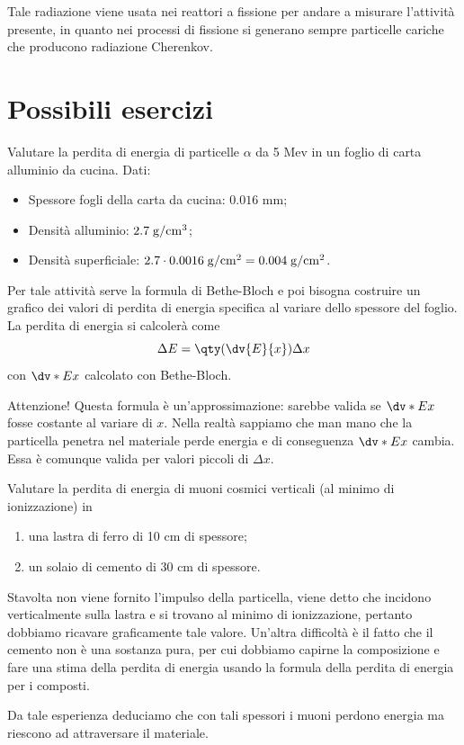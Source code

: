 Tale radiazione viene usata nei reattori a fissione per andare a misurare l'attività presente, in quanto nei processi di fissione si generano sempre particelle cariche che producono radiazione Cherenkov.

\section{Possibili esercizi}

\begin{esercizio}
    Valutare la perdita di energia di particelle $\alpha$ da 5 Mev in un foglio di carta alluminio da cucina. Dati:

    \begin{itemize}
        \item Spessore fogli della carta da cucina: $0.016$ mm;
        \item Densità alluminio: $2.7 \; \rm g/cm^3$;
        \item Densità superficiale: $2.7 \cdot 0.0016 \rm \; g/cm^2=0.004 \; g/cm^2$.
    \end{itemize}
    
    Per tale attività serve la formula di Bethe-Bloch e poi bisogna costruire un grafico dei valori di perdita di energia specifica al variare dello spessore del foglio. La perdita di energia si calcolerà come
    \begin{equation*}
        \Delta E=\qty(\dv{E}{x}) \Delta x
    \end{equation*}
    con $\dv*{E}{x}$ calcolato con Bethe-Bloch.

    Attenzione! Questa formula è un'approssimazione: sarebbe valida se $\dv*{E}{x}$ fosse costante al variare di $x$. Nella realtà sappiamo che man mano che la particella penetra nel materiale perde energia e di conseguenza $\dv*{E}{x}$ cambia. Essa è comunque valida per valori piccoli di $\Delta x$.
\end{esercizio}

\begin{esercizio}
    Valutare la perdita di energia di muoni cosmici verticali (al minimo di ionizzazione) in
    \begin{enumerate}[label=\alph*.]
        \item una lastra di ferro di 10 cm di spessore;
        \item un solaio di cemento di 30 cm di spessore.
    \end{enumerate}
    Stavolta non viene fornito l'impulso della particella, viene detto che incidono verticalmente sulla lastra e si trovano al minimo di ionizzazione, pertanto dobbiamo ricavare graficamente tale valore. Un'altra difficoltà è il fatto che il cemento non è una sostanza pura, per cui dobbiamo capirne la composizione e fare una stima della perdita di energia usando la formula della perdita di energia per i composti.
    
    Da tale esperienza deduciamo che con tali spessori i muoni perdono energia ma riescono ad attraversare il materiale.
\end{esercizio}

